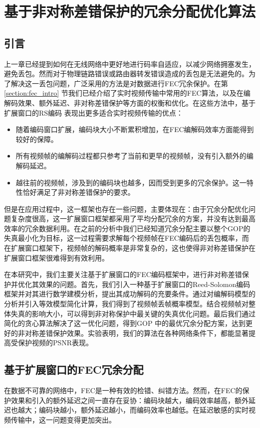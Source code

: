 \chapter{基于非对称差错保护的冗余分配优化算法}
\label{chap:fec}

\section{引言}
上一章已经提到如何在无线网络中更好地进行码率自适应，以减少网络拥塞发生，避免丢包。然而对于物理链路错误或路由器转发错误造成的丢包是无法避免的。为了解决这一丢包问题，广泛采用的方法是对数据进行FEC冗余保护。在第 \ref{section:fec_intro} 节我们已经介绍了实时视频传输中常用的FEC算法，以及在编解码效果、额外延迟、非对称差错保护等方面的权衡和优化。在这些方法中，基于扩展窗口的RS编码 \cite{sejdinovic2009expanding} 表现出更多适合实时视频传输的优点：
\begin{itemize}
    \item 随着编码窗口扩展，编码块大小不断累积增加，在FEC编解码效率方面能得到较好的保障。
    \item 所有视频帧的编解码过程都只参考了当前和更早的视频帧，没有引入额外的编解码延迟。
    \item 越往前的视频帧，涉及到的编码块也越多，因而受到更多的冗余保护。这一特性恰好满足了非对称差错保护的要求。
\end{itemize}

但是在应用过程中，这一框架也存在一些问题，主要体现在：由于冗余分配优化问题复杂度很高，这一扩展窗口框架都采用了平均分配冗余的方案，并没有达到最高效率的冗余数据利用。在之前的分析中我们已经知道冗余分配主要以整个GOP的失真最小化为目标，这一过程需要求解每个视频帧在FEC编码后的丢包概率，而在扩展窗口框架下，视频帧的解码概率是非常复杂的，这也使得非对称差错保护在扩展窗口框架很难得到有效利用。

在本研究中，我们主要关注基于扩展窗口的FEC编码框架中，进行非对称差错保护并优化其效果的问题。首先，我们引入一种基于扩展窗口的Reed-Solomon编码框架并对其进行数学建模分析，提出其成功解码的充要条件。通过对编解码模型的分析并引入等效模型简化计算，我们得到了视频帧丢帧概率模型。结合视频帧对整体失真的影响大小，可以得到非对称保护中最关键的失真优化问题。最后我们通过简化的贪心算法解决了这一优化问题，得到GOP 中的最优冗余分配方案，达到更好的非对称差错保护效果。实验表明，我们的算法在各种网络条件下，都能显著提高受保护视频的PSNR表现。


\section{基于扩展窗口的FEC冗余分配}
在数据不可靠的网络中，FEC是一种有效的检错、纠错方法。然而，在FEC的保护效果和引入的额外延迟之间一直存在妥协：编码块越大，编码效率越高，额外延迟也越大；编码块越小，额外延迟越小，而编码效率也越低。在延迟敏感的实时视频传输中，这一问题变得更加突出。

